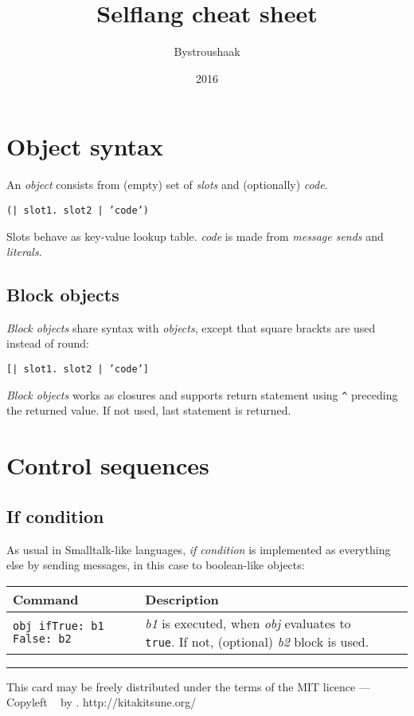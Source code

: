 \documentclass[10pt]{article}
\title{Selflang cheat sheet}
\author{Bystroushaak}
\date{2016}
\renewcommand{\maketitle}{
    {\begin{center}\Large \mythetitle\end{center}}
}
\begin{document}
\begin{multicols*}{3}
\maketitle

\section{Object syntax}
An \textit{object} consists from (empty) set of \textit{slots} and (optionally) \textit{code}.

\vspace*{0.2cm}
\texttt{(| slot1. slot2 | 'code')}
\vspace*{0.2cm}

Slots behave as key-value lookup table. \textit{code} is made from \textit{message sends} and \textit{literals}.

\subsection{Block objects}
\textit{Block objects} share syntax with \textit{objects}, except that square brackts are used instead of round:

\vspace*{0.2cm}
\texttt{[| slot1. slot2 | 'code']}
\vspace*{0.2cm}

\textit{Block objects} works as closures and supports return statement using \texttt{\^} preceding the returned value. If not used, last statement is returned.






\section{Control sequences}
\subsection{If condition}

As usual in Smalltalk-like languages, \textit{if condition} is implemented as everything else by sending messages, in this case to boolean-like objects:

\vspace*{0.2cm}
\begin{tabular}{ p{3.4cm} p{4cm} l l }
Command & Description \\ \hline
\texttt{obj\ ifTrue:\ b1 False: b2} & \textit{b1} is executed, when \textit{obj} evaluates to \texttt{true}. If not, (optional) \textit{b2} block is used. \\
\hline
\end{tabular}








\vfill \hrule\smallskip
{\small This card may be freely distributed under
the terms of the MIT licence ---
Copyleft \textcopyleft\ \thedate{} by \theauthor{}.}
{\small http://kitakitsune.org/}
\end{multicols*}
\end{document}
